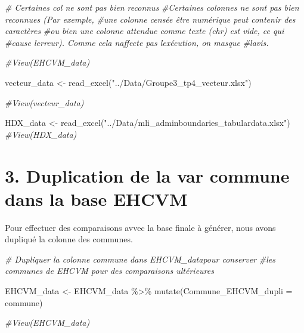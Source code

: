 \documentclass[
]{article}
\newenvironment{Shaded}{\begin{snugshade}}{\end{snugshade}}
\newcommand{\AttributeTok}[1]{\textcolor[rgb]{0.77,0.63,0.00}{#1}}
\newcommand{\CommentTok}[1]{\textcolor[rgb]{0.56,0.35,0.01}{\textit{#1}}}
\newcommand{\FunctionTok}[1]{\textcolor[rgb]{0.00,0.00,0.00}{#1}}
\newcommand{\NormalTok}[1]{#1}
\newcommand{\OtherTok}[1]{\textcolor[rgb]{0.56,0.35,0.01}{#1}}
\newcommand{\SpecialCharTok}[1]{\textcolor[rgb]{0.00,0.00,0.00}{#1}}
\newcommand{\StringTok}[1]{\textcolor[rgb]{0.31,0.60,0.02}{#1}}
\begin{document}
\begin{Shaded}
\begin{Highlighting}[]
\CommentTok{\# Certaines col ne sont pas bien reconnus }
\CommentTok{\#Certaines colonnes ne sont pas bien reconnues (Par exemple,}
\CommentTok{\#une colonne censée être numérique peut contenir des caractères}
\CommentTok{\#ou bien une colonne attendue comme texte (chr) est vide, ce qui}
\CommentTok{\#cause l\textquotesingle{}erreur). Comme cela n\textquotesingle{}affecte pas l\textquotesingle{}exécution, on masque }
\CommentTok{\#l\textquotesingle{}avis.}

\CommentTok{\#View(EHCVM\_data)}

\NormalTok{vecteur\_data }\OtherTok{\textless{}{-}} \FunctionTok{read\_excel}\NormalTok{(}\StringTok{"../Data/Groupe3\_tp4\_vecteur.xlsx"}\NormalTok{)   }

\CommentTok{\#View(vecteur\_data)}

\NormalTok{HDX\_data }\OtherTok{\textless{}{-}} \FunctionTok{read\_excel}\NormalTok{(}\StringTok{"../Data/mli\_adminboundaries\_tabulardata.xlsx"}\NormalTok{)}
\CommentTok{\#View(HDX\_data)}
\end{Highlighting}
\end{Shaded}

\hypertarget{duplication-de-la-var-commune-dans-la-base-ehcvm}{%
\section{3. Duplication de la var commune dans la base
EHCVM}\label{duplication-de-la-var-commune-dans-la-base-ehcvm}}

Pour effectuer des comparaisons avvec la base finale à générer, nous
avons dupliqué la colonne des communes.

\begin{Shaded}
\begin{Highlighting}[]
\CommentTok{\# Dupliquer la colonne commune dans EHCVM\_datapour conserver}
\CommentTok{\#les communes de EHCVM pour des comparaisons ultérieures}

\NormalTok{EHCVM\_data }\OtherTok{\textless{}{-}}\NormalTok{ EHCVM\_data }\SpecialCharTok{\%\textgreater{}\%}
  \FunctionTok{mutate}\NormalTok{(}\AttributeTok{Commune\_EHCVM\_dupli =} \StringTok{\textasciigrave{}}\AttributeTok{commune}\StringTok{\textasciigrave{}}\NormalTok{)}

\CommentTok{\#View(EHCVM\_data)}
\end{Highlighting}
\end{Shaded}
\end{document}
